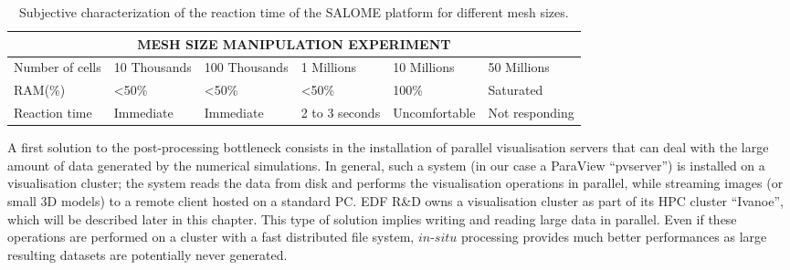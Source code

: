 \begin{table}
\centering
\begin{tabular}{|p{1.5cm}|p{2.0cm}|p{2.20cm}|p{1.50cm}|p{2cm}|p{2cm}|}
\hline
\multicolumn{6}{|c|}{\textbf{MESH SIZE MANIPULATION EXPERIMENT}}\\
\hline
Number of cells & 10 Thousands & 100 Thousands & 1 Millions & 10 Millions & 50 Millions \\
\hline
RAM(\%) & <50\% & <50\% & <50\% & 100\% & Saturated \\
\hline
Reaction time & Immediate & Immediate & 2 to 3 seconds & Uncomfortable & Not responding \\
\hline
\end{tabular}
\caption{Subjective characterization of the reaction time of the SALOME platform for different mesh sizes.}
\label{fig:tabmot}
\vspace{-0.15in}
\end{table}

A first solution to the post-processing bottleneck consists in the installation 
of parallel visualisation servers that can deal with the large amount of data generated 
by the numerical simulations. In general, such
a system (in our case a ParaView ``pvserver'') is installed on a visualisation
cluster; the system reads the data from disk and performs the visualisation operations in
parallel, while streaming images (or small 3D models) to a remote client hosted on a standard PC. 
EDF R\&D owns a visualisation cluster as part of its HPC cluster ``Ivanoe'', which will
be described later in this chapter. This type of solution implies writing and 
reading large data in parallel. Even if
these operations are performed on a cluster with a fast distributed file system,
$in$-$situ$ processing provides much better performances as large resulting datasets 
are potentially never generated. 

